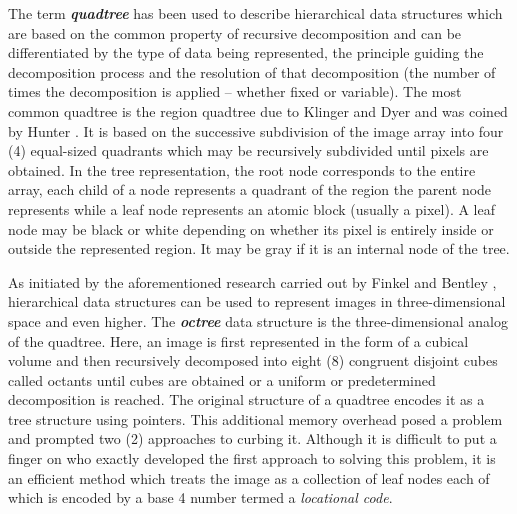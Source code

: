 \hspace{30} The   term   \textit{\textbf{quadtree}}   has   been   used   to   describe   hierarchical   data  
structures   which   are   based   on   the   common   property   of   recursive  
decomposition   and   can   be   differentiated   by   the   type   of   data   being   represented,  
the   principle   guiding   the   decomposition   process   and   the   resolution   of   that  
decomposition   (the   number   of   times   the   decomposition   is   applied   –   whether  
fixed   or   variable).   The   most   common   quadtree   is   the   region   quadtree   due   to  
Klinger   and   Dyer \cite{24}   and   was   coined   by   Hunter \cite{25}. It   is   based   on   the  
successive   subdivision   of   the   image   array   into   four   (4)   equal-­sized   quadrants  
which   may   be   recursively   subdivided   until   pixels   are   obtained.   In   the   tree  
representation,   the   root   node   corresponds   to   the   entire   array,   each   child   of   a  
node   represents   a   quadrant   of   the   region   the   parent   node   represents   while   a  
leaf   node   represents   an   atomic   block   (usually   a   pixel).   A   leaf   node   may   be  
black   or   white   depending   on   whether   its   pixel   is   entirely   inside   or   outside   the  
represented region. It may be gray if it is an internal node of the tree.  

\hspace{30} As   initiated   by   the   aforementioned   research   carried   out   by   Finkel   and  
Bentley \cite{26},   hierarchical   data   structures   can   be   used   to   represent   images   in  
three­-dimensional   space   and   even   higher.   The   \textit{\textbf{octree}}   data   structure   is   the  
three­-dimensional   analog   of   the   quadtree.   Here,   an   image   is   first   represented   in  
the   form   of   a   cubical   volume   and   then   recursively   decomposed   into   eight   (8)  
congruent   disjoint   cubes   called   octants   until   cubes   are   obtained   or   a   uniform   or  
predetermined   decomposition   is   reached.   The   original   structure   of   a   quadtree  
encodes   it   as   a   tree   structure   using   pointers.   This   additional   memory   overhead  
posed   a   problem   and   prompted   two   (2)   approaches   to   curbing   it.   Although   it   is  
difficult   to   put   a   finger   on   who   exactly   developed   the   first   approach   to   solving  
this   problem,   it   is   an   efficient   method   which   treats   the   image   as   a   collection   of  
leaf   nodes   each   of   which   is   encoded   by   a   base   4   number   termed   a   \textit{locational  
code}. 

